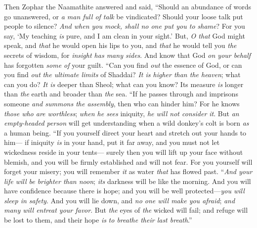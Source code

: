 \begin{biblechapter} %
 Then Zophar the Naamathite answered and said,
\verse “Should an abundance of words go unanswered, 
or \textit{a man full of talk} be vindicated?
\verse Should your loose talk put people to silence? 
\textit{And when you mock, shall no one put you to shame}?
\verse For you say, ‘My teaching \textit{is} pure, 
and I am clean in your sight.’
\verse But, \textit{O that} God might speak, 
and \textit{that} he would open his lips to you,
\verse and \textit{that} he would tell you \textit{the} secrets of wisdom, 
for \textit{insight has many sides}. 
And know that God \textit{on your behalf} has forgotten \textit{some of} your guilt.
\verse “Can you find \textit{out} the essence of God, 
or can you find \textit{out} \textit{the ultimate limits} of Shaddai?
\verse \textit{It is higher than the heaven}; what can you do? 
\textit{It is} deeper than Sheol; what can you know?
\verse Its measure \textit{is} longer than \textit{the} earth 
and broader than \textit{the} sea.
\verse “If he passes through and imprisons someone 
\textit{and summons the assembly}, then who can hinder him?
\verse For he knows \textit{those who are worthless}; 
\textit{when he sees} iniquity, \textit{he will not consider it}.
\verse But \textit{an empty-headed person} will get understanding 
when a wild donkey’s colt is born \textit{as} a human being.
\verse “If you yourself direct your heart 
and stretch out your hands to him—
\verse if iniquity \textit{is} in your hand, put it far away, 
and you must not let wickedness reside in your tents—
\verse surely then you will lift up your face without blemish, 
and you will be firmly established and will not fear.
\verse For you yourself will forget your misery; 
you will remember \textit{it} as water \textit{that} has flowed past.
\verse “\textit{And your life will be brighter than noon}; 
\textit{its} darkness will be like the morning.
\verse And you will have confidence because there is hope; 
and you will be well protected—\textit{you will sleep in safety}.
\verse And you will lie down, and \textit{no one will make you afraid}; 
\textit{and many will entreat your favor}.
\verse But \textit{the} eyes of \textit{the} wicked will fail; 
and refuge will be lost to them, 
and their hope \textit{is} \textit{to breathe their last breath}.”
\end{biblechapter}

